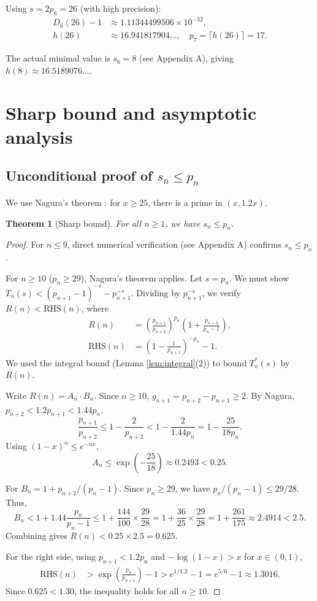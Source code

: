 \documentclass[12pt]{article}
\theoremstyle{plain}
\newtheorem{theorem}{Theorem}
\theoremstyle{definition}
\theoremstyle{remark}
\begin{document}
Using $s = 2p_6 = 26$ (with high precision):
\begin{align*}
D_6(26) - 1 &\approx 1.11344499506 \times 10^{-32}, \\
h(26) &\approx 16.941817904\ldots, \quad p_7 = \lceil h(26) \rceil = 17.
\end{align*}

The actual minimal value is $s_6 = 8$ (see Appendix A), giving $h(8) \approx 16.5189076\ldots$.

\section{Sharp bound and asymptotic analysis}

\subsection{Unconditional proof of $s_n \le p_n$}

We use Nagura's theorem \cite{Nagura1952}: for $x \geq 25$, there is a prime in $(x, 1.2x)$.

\begin{theorem}[Sharp bound]
\label{thm:nagura}
For all $n \geq 1$, we have $s_n \leq p_n$.
\end{theorem}

\begin{proof}
For $n \leq 9$, direct numerical verification (see Appendix A) confirms $s_n \leq p_n$.

For $n \geq 10$ ($p_n \geq 29$), Nagura's theorem applies. Let $s = p_n$. We must show $T_n(s) < (p_{n+1}-1)^{-s} - p_{n+1}^{-s}$. Dividing by $p_{n+1}^{-s}$, we verify $R(n) < \text{RHS}(n)$, where
\begin{align*}
R(n) &= \left(\frac{p_{n+1}}{p_{n+2}}\right)^{p_n} \left(1 + \frac{p_{n+2}}{p_n-1}\right), \\
\text{RHS}(n) &= \left(1 - \frac{1}{p_{n+1}}\right)^{-p_n} - 1.
\end{align*}
We used the integral bound (Lemma \ref{lem:integral}(2)) to bound $T_n^*(s)$ by $R(n)$.

Write $R(n) = A_n \cdot B_n$. Since $n \geq 10$, $g_{n+1} = p_{n+2} - p_{n+1} \geq 2$.
By Nagura, $p_{n+2} < 1.2 p_{n+1} < 1.44 p_n$.
\[
\frac{p_{n+1}}{p_{n+2}} \leq 1 - \frac{2}{p_{n+2}} < 1 - \frac{2}{1.44 p_n} = 1 - \frac{25}{18p_n}.
\]
Using $(1-x)^n \leq e^{-nx}$,
\[
A_n \leq \exp\left(-\frac{25}{18}\right) \approx 0.2493 < 0.25.
\]

For $B_n = 1 + p_{n+2}/(p_n-1)$. Since $p_n \geq 29$, we have $p_n/(p_n-1) \leq 29/28$. Thus,
\[
B_n < 1 + 1.44 \frac{p_n}{p_n-1} \leq 1 + \frac{144}{100} \times \frac{29}{28} = 1 + \frac{36}{25} \times \frac{29}{28} = 1 + \frac{261}{175} \approx 2.4914 < 2.5.
\]
Combining gives $R(n) < 0.25 \times 2.5 = 0.625$.

For the right side, using $p_{n+1} < 1.2p_n$ and $-\log(1-x) > x$ for $x \in (0,1)$,
\begin{align*}
\text{RHS}(n) &> \exp\left(\frac{p_n}{p_{n+1}}\right) - 1 > e^{1/1.2} - 1 = e^{5/6} - 1 \approx 1.3016.
\end{align*}
Since $0.625 < 1.30$, the inequality holds for all $n \geq 10$.
\end{proof}
\end{document}
